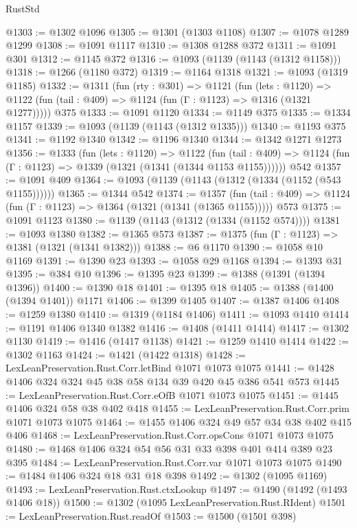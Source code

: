 \begin{lexlean}{RustStd}
\begin{coremodule}
@1303 := @1302 @1096
@1305 := @1301 (@1303 @1108)
@1307 := @1078 @1289 @1299
@1308 := @1091 @1117
@1310 := @1308 @1288 @372
@1311 := @1091 @301
@1312 := @1145 @372
@1316 := @1093 (@1139 (@1143 (@1312 @1158)))
@1318 := @1266 (@1180 @372)
@1319 := @1164 @1318
@1321 := @1093 (@1319 @1185)
@1332 := @1311
    (fun (rty : @301) =>
    @1121
      (fun (lets : @1120) =>
      @1122 (fun (tail : @409) => @1124 (fun (Γ : @1123) => @1316 (@1321 @1277)))))
    @375
@1333 := @1091 @1120
@1334 := @1149 @375
@1335 := @1334 @1157
@1339 := @1093 (@1139 (@1143 (@1312 @1335)))
@1340 := @1193 @375
@1341 := @1192 @1340
@1342 := @1196 @1340
@1344 := @1342 @1271 @1273
@1356 := @1333
    (fun (lets : @1120) =>
    @1122
      (fun (tail : @409) => @1124 (fun (Γ : @1123) => @1339 (@1321 (@1341 (@1344 @1153 @1155))))))
    @542
@1357 := @1091 @409
@1364 := @1093 (@1139 (@1143 (@1312 (@1334 (@1152 (@543 @1155))))))
@1365 := @1344 @542
@1374 := @1357
    (fun (tail : @409) => @1124 (fun (Γ : @1123) => @1364 (@1321 (@1341 (@1365 @1155)))))
    @573
@1375 := @1091 @1123
@1380 := @1139 (@1143 (@1312 (@1334 (@1152 @574))))
@1381 := @1093 @1380
@1382 := @1365 @573
@1387 := @1375 (fun (Γ : @1123) => @1381 (@1321 (@1341 @1382)))
@1388 := @6 @1170
@1390 := @1058 @10 @1169
@1391 := @1390 @23
@1393 := @1058 @29 @1168
@1394 := @1393 @31
@1395 := @384 @10
@1396 := @1395 @23
@1399 := @1388 (@1391 (@1394 @1396))
@1400 := @1390 @18
@1401 := @1395 @18
@1405 := @1388 (@1400 (@1394 @1401)) @1171
@1406 := @1399 @1405
@1407 := @1387 @1406
@1408 := @1259 @1380
@1410 := @1319 (@1184 @1406)
@1411 := @1093 @1410
@1414 := @1191 @1406 @1340 @1382
@1416 := @1408 (@1411 @1414)
@1417 := @1302 @1130
@1419 := @1416 (@1417 @1138)
@1421 := @1259 @1410 @1414
@1422 := @1302 @1163
@1424 := @1421 (@1422 @1318)
@1428 := LexLeanPreservation.Rust.Corr.letBind @1071 @1073 @1075
@1441 := @1428 @1406 @324 @324 @45 @38 @58 @134 @39 @420 @45 @386 @541 @573
@1445 := LexLeanPreservation.Rust.Corr.eOfB @1071 @1073 @1075
@1451 := @1445 @1406 @324 @58 @38 @402 @418
@1455 := LexLeanPreservation.Rust.Corr.prim @1071 @1073 @1075
@1464 := @1455 @1406 @324 @49 @57 @34 @38 @402 @415 @406
@1468 := LexLeanPreservation.Rust.Corr.opsCons @1071 @1073 @1075
@1480 := @1468 @1406 @324 @54 @56 @31 @33 @398 @401 @414 @389 @23 @395
@1484 := LexLeanPreservation.Rust.Corr.var @1071 @1073 @1075
@1490 := @1484 @1406 @324 @18 @31 @18 @398
@1492 := @1302 (@1095 @1169)
@1493 := LexLeanPreservation.Rust.ctxLookup
@1497 := @1490 (@1492 (@1493 @1406 @18))
@1500 := @1302 (@1095 LexLeanPreservation.Rust.RIdent)
@1501 := LexLeanPreservation.Rust.readOf
@1503 := @1500 (@1501 @398)

\end{coremodule}
\end{lexlean}
